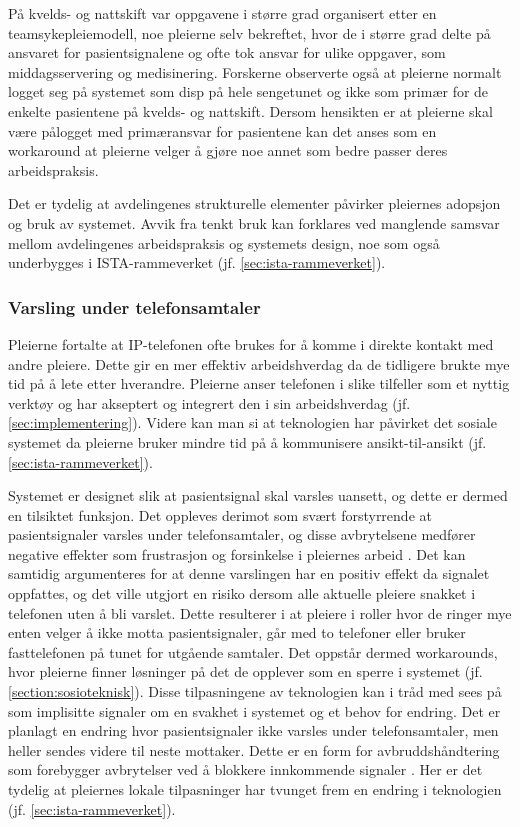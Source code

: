 \noindent
På kvelds- og nattskift var oppgavene i større grad organisert etter en teamsykepleiemodell, noe pleierne selv bekreftet, hvor de i større grad delte på ansvaret for pasientsignalene og ofte tok ansvar for ulike oppgaver, som middagsservering og medisinering. Forskerne observerte også at pleierne normalt logget seg på systemet som disp på hele sengetunet og ikke som primær for de enkelte pasientene på kvelds- og nattskift. Dersom hensikten er at pleierne skal være pålogget med primæransvar for pasientene kan det anses som en workaround at pleierne velger å gjøre noe annet som bedre passer deres arbeidspraksis.

\noindent
Det er tydelig at avdelingenes strukturelle elementer påvirker pleiernes adopsjon og bruk av systemet. Avvik fra tenkt bruk kan forklares ved manglende samsvar mellom avdelingenes arbeidspraksis og systemets design, noe som også underbygges i ISTA-rammeverket (jf. \ref{sec:ista-rammeverket}). 

\subsubsection{Varsling under telefonsamtaler}
Pleierne fortalte at IP-telefonen ofte brukes for å komme i direkte kontakt med andre pleiere. Dette gir en mer effektiv arbeidshverdag da de tidligere brukte mye tid på å lete etter hverandre. Pleierne anser telefonen i slike tilfeller som et nyttig verktøy og har akseptert og integrert den i sin arbeidshverdag (jf. \ref{sec:implementering}). Videre kan man si at teknologien har påvirket det sosiale systemet da pleierne bruker mindre tid på å kommunisere ansikt-til-ansikt (jf. \ref{sec:ista-rammeverket}). 

\noindent
Systemet er designet slik at pasientsignal skal varsles uansett, og dette er dermed en tilsiktet funksjon. Det oppleves derimot som svært forstyrrende at pasientsignaler varsles under telefonsamtaler, og disse avbrytelsene medfører negative effekter som frustrasjon og forsinkelse i pleiernes arbeid \citep{Grundgeiger09}. Det kan samtidig argumenteres for at denne varslingen har en positiv effekt da signalet oppfattes, og det ville utgjort en risiko dersom alle aktuelle pleiere snakket i telefonen uten å bli varslet. Dette resulterer i at pleiere i roller hvor de ringer mye enten velger å ikke motta pasientsignaler, går med to telefoner eller bruker fasttelefonen på tunet for utgående samtaler. Det oppstår dermed workarounds, hvor pleierne finner løsninger på det de opplever som en sperre i systemet (jf. \ref{section:sosioteknisk}). Disse tilpasningene av teknologien kan i tråd med \citet{Coiera07} sees på som implisitte signaler om en svakhet i systemet og et behov for endring. Det er planlagt en endring hvor pasientsignaler ikke varsles under telefonsamtaler, men heller sendes videre til neste mottaker. Dette er en form for avbruddshåndtering som forebygger avbrytelser ved å blokkere innkommende signaler \citep{Grandhi10}. Her er det tydelig at pleiernes lokale tilpasninger har tvunget frem en endring i teknologien (jf. \ref{sec:ista-rammeverket}).
	
